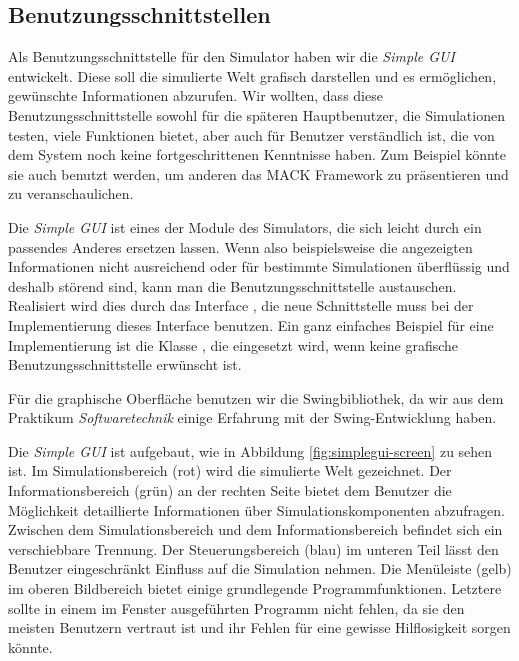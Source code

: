 \subsection{Benutzungsschnittstellen}\label{subsec:real_interfaces}

Als Benutzungsschnittstelle für den Simulator haben wir die \emph{Simple GUI} entwickelt. Diese soll die simulierte Welt grafisch darstellen und es ermöglichen, gewünschte Informationen abzurufen. Wir wollten, dass diese Benutzungsschnittstelle sowohl für die späteren Hauptbenutzer, die Simulationen testen, viele Funktionen bietet, aber auch für Benutzer verständlich ist, die von dem System noch keine fortgeschrittenen Kenntnisse haben. Zum Beispiel könnte sie auch benutzt werden, um anderen das MACK Framework zu präsentieren und zu veranschaulichen.

Die \emph{Simple GUI} ist eines der Module des Simulators, die sich leicht durch ein passendes Anderes ersetzen lassen. Wenn also beispielsweise die angezeigten Informationen nicht ausreichend oder für bestimmte Simulationen überflüssig und deshalb störend sind, kann man die Benutzungsschnittstelle austauschen. Realisiert wird dies durch das Interface , die neue Schnittstelle muss bei der Implementierung dieses Interface benutzen. Ein ganz einfaches Beispiel für eine Implementierung ist die Klasse , die eingesetzt wird, wenn keine grafische Benutzungsschnittstelle erwünscht ist.

Für die graphische Oberfläche benutzen wir die Swingbibliothek, da wir aus dem Praktikum \emph{Softwaretechnik} einige Erfahrung mit der Swing-Entwicklung haben.

Die \emph{Simple GUI} ist aufgebaut, wie in Abbildung \ref{fig:simplegui-screen} zu sehen ist. Im Simulationsbereich (rot) wird die simulierte Welt gezeichnet. Der Informationsbereich (grün) an der rechten Seite bietet dem Benutzer die Möglichkeit detaillierte Informationen über Simulationskomponenten abzufragen. Zwischen dem Simulationsbereich und dem Informationsbereich befindet sich ein verschiebbare Trennung. Der Steuerungsbereich (blau) im unteren Teil lässt den Benutzer eingeschränkt Einfluss auf die Simulation nehmen. Die Menüleiste (gelb) im oberen Bildbereich bietet einige grundlegende Programmfunktionen. Letztere sollte in einem im Fenster ausgeführten Programm nicht fehlen, da sie den meisten Benutzern vertraut ist und ihr Fehlen für eine gewisse Hilflosigkeit sorgen könnte. 

